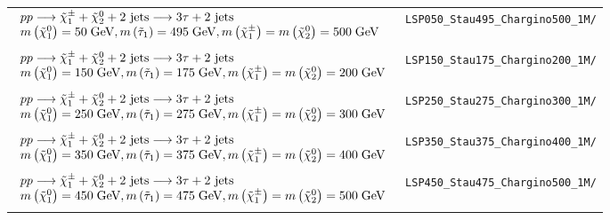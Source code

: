 \begin{table}[ht]
{\begin{tabular}{| l | l |}
			$\begin{array}{l}
			pp \longrightarrow \tilde{\chi}^{\pm}_{1} + \tilde{\chi}^{0}_{2} + 2\text{ jets} \longrightarrow 3\tau + 2\text{ jets} \\
			m\left(\tilde{\chi}^{0}_{1}\right) = 50\;\text{Ge}\kern-0.06667em\text{V}, 
			m\left(\tilde{\tau}_{1}\right) = 495\;\text{Ge}\kern-0.06667em\text{V},
			m\left(\tilde{\chi}^{\pm}_{1}\right)  = m\left(\tilde{\chi}^{0}_{2}\right) = 500\;\text{Ge}\kern-0.06667em\text{V} \\
			\end{array}$ & \texttt{LSP050\_Stau495\_Chargino500\_1M/}	\\
			&\\
		
			$\begin{array}{l}
			pp \longrightarrow \tilde{\chi}^{\pm}_{1} + \tilde{\chi}^{0}_{2} + 2\text{ jets} \longrightarrow 3\tau + 2\text{ jets} \\
			m\left(\tilde{\chi}^{0}_{1}\right) = 150\;\text{Ge}\kern-0.06667em\text{V}, 
			m\left(\tilde{\tau}_{1}\right) = 175\;\text{Ge}\kern-0.06667em\text{V},
			m\left(\tilde{\chi}^{\pm}_{1}\right)  = m\left(\tilde{\chi}^{0}_{2}\right) = 200\;\text{Ge}\kern-0.06667em\text{V} \\
			\end{array}$ & \texttt{LSP150\_Stau175\_Chargino200\_1M/}	\\
			&\\
			
			$\begin{array}{l}
			pp \longrightarrow \tilde{\chi}^{\pm}_{1} + \tilde{\chi}^{0}_{2} + 2\text{ jets} \longrightarrow 3\tau + 2\text{ jets} \\
			m\left(\tilde{\chi}^{0}_{1}\right) = 250\;\text{Ge}\kern-0.06667em\text{V}, 
			m\left(\tilde{\tau}_{1}\right) = 275\;\text{Ge}\kern-0.06667em\text{V},
			m\left(\tilde{\chi}^{\pm}_{1}\right)  = m\left(\tilde{\chi}^{0}_{2}\right) = 300\;\text{Ge}\kern-0.06667em\text{V} \\
			\end{array}$ & \texttt{LSP250\_Stau275\_Chargino300\_1M/}	\\
			&\\

			$\begin{array}{l}
			pp \longrightarrow \tilde{\chi}^{\pm}_{1} + \tilde{\chi}^{0}_{2} + 2\text{ jets} \longrightarrow 3\tau + 2\text{ jets} \\
			m\left(\tilde{\chi}^{0}_{1}\right) = 350\;\text{Ge}\kern-0.06667em\text{V}, 
			m\left(\tilde{\tau}_{1}\right) = 375\;\text{Ge}\kern-0.06667em\text{V},
			m\left(\tilde{\chi}^{\pm}_{1}\right)  = m\left(\tilde{\chi}^{0}_{2}\right) = 400\;\text{Ge}\kern-0.06667em\text{V} \\
			\end{array}$ & \texttt{LSP350\_Stau375\_Chargino400\_1M/}	\\
			&\\
			
			$\begin{array}{l}
			pp \longrightarrow \tilde{\chi}^{\pm}_{1} + \tilde{\chi}^{0}_{2} + 2\text{ jets} \longrightarrow 3\tau + 2\text{ jets} \\
			m\left(\tilde{\chi}^{0}_{1}\right) = 450\;\text{Ge}\kern-0.06667em\text{V}, 
			m\left(\tilde{\tau}_{1}\right) = 475\;\text{Ge}\kern-0.06667em\text{V},
			m\left(\tilde{\chi}^{\pm}_{1}\right)  = m\left(\tilde{\chi}^{0}_{2}\right) = 500\;\text{Ge}\kern-0.06667em\text{V} \\
			\end{array}$ & \texttt{LSP450\_Stau475\_Chargino500\_1M/}	\\
			&\\
			

\end{tabular}}
\end{table}
